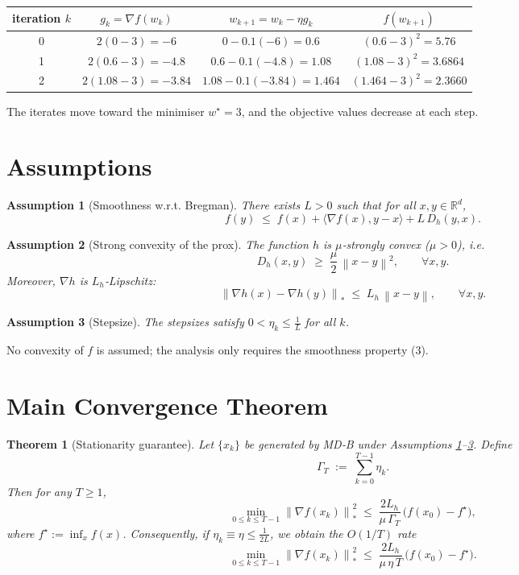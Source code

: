 \documentclass{article}
\newtheorem{theorem}{Theorem}
\newtheorem{assumption}{Assumption}
\newcommand{\norm}[1]{\left\lVert#1\right\rVert}
\newcommand{\dualnorm}[1]{\left\lVert#1\right\rVert_{*}}
\newcommand{\inner}[2]{\langle #1,#2\rangle}
\newcommand{\D}[2]{D_{h}(#1,#2)}
\begin{document}
\begin{center}
\begin{tabular}{c|c|c|c}
iteration $k$ & $g_k=\nabla f(w_k)$ & $w_{k+1}=w_k-\eta g_k$ & $f(w_{k+1})$\\\hline
0 & $2(0-3)=-6$ & $0-0.1(-6)=0.6$ & $(0.6-3)^2=5.76$\\
1 & $2(0.6-3)=-4.8$ & $0.6-0.1(-4.8)=1.08$ & $(1.08-3)^2=3.6864$\\
2 & $2(1.08-3)=-3.84$ & $1.08-0.1(-3.84)=1.464$ & $(1.464-3)^2=2.3660$
\end{tabular}
\end{center}
The iterates move toward the minimiser $w^\star=3$, and the objective
values decrease at each step.

\section*{Assumptions}
\begin{assumption}[Smoothness w.r.t. Bregman]\label{ass:smooth}
There exists $L>0$ such that for all $x,y\in\mathbb{R}^d$,
\[
f(y)\;\le\;f(x)+\inner{\nabla f(x)}{y-x}+L\,\D{y}{x}.
\tag{3}
\]
\end{assumption}

\begin{assumption}[Strong convexity of the prox]\label{ass:strong}
The function $h$ is $\mu$‑strongly convex ($\mu>0$), i.e.
\[
\D{x}{y}\;\ge\;\frac{\mu}{2}\,\norm{x-y}^2,
\qquad\forall x,y.
\tag{4}
\]
Moreover, $\nabla h$ is $L_h$‑Lipschitz:
\[
\dualnorm{\nabla h(x)-\nabla h(y)}\;\le\;L_h\,\norm{x-y},
\qquad\forall x,y.
\tag{5}
\]
\end{assumption}

\begin{assumption}[Stepsize]\label{ass:step}
The stepsizes satisfy $0<\eta_k\le\frac{1}{L}$ for all $k$.
\end{assumption}

No convexity of $f$ is assumed; the analysis only requires the
smoothness property (3).

\section*{Main Convergence Theorem}
\begin{theorem}[Stationarity guarantee]\label{thm:main}
Let $\{x_k\}$ be generated by MD‑B under Assumptions
\ref{ass:smooth}–\ref{ass:step}. Define
\[
\Gamma_T\;:=\;\sum_{k=0}^{T-1}\eta_k .
\]
Then for any $T\ge 1$,
\[
\min_{0\le k\le T-1}
\dualnorm{\nabla f(x_k)}^{2}
\;\le\;
\frac{2L_h}{\mu\,\Gamma_T}\,
\bigl(f(x_0)-f^\star\bigr),
\tag{6}
\]
where $f^\star:=\inf_{x}f(x)$. Consequently, if $\eta_k\equiv\eta\le
\frac{1}{2L}$, we obtain the $O(1/T)$ rate
\[
\min_{0\le k\le T-1}\dualnorm{\nabla f(x_k)}^{2}
\;\le\;
\frac{2L_h}{\mu\,\eta\,T}\,
\bigl(f(x_0)-f^\star\bigr).
\]
\end{theorem}
\end{document}
